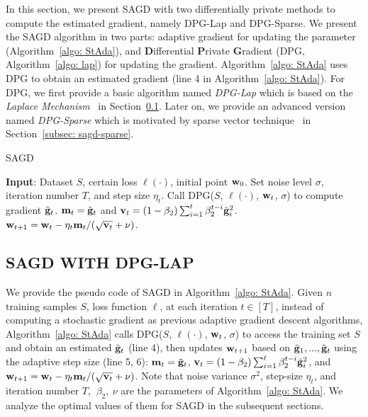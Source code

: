 \documentclass[11pt]{article}
\begin{document}
In this section, we present SAGD with two differentially private methods to compute the estimated gradient, namely DPG-Lap and DPG-Sparse.
We present the SAGD algorithm in two parts: adaptive gradient for updating the parameter (Algorithm~\ref{algo: StAda}), and \textbf{D}ifferential \textbf{P}rivate\textbf{ G}radient (DPG, Algorithm~\ref{algo: lap}) for updating the gradient. Algorithm~\ref{algo: StAda} uses 
DPG to obtain an estimated gradient (line 4 in Algorithm~\ref{algo: StAda}). For DPG, we first provide a basic algorithm named \emph{DPG-Lap} which is based on the \emph{Laplace Mechanism}~\citep{dwro2014} in Section~\ref{subsec: sagd_lap}. Later on, we provide an advanced version named \emph{DPG-Sparse} which is motivated by sparse vector technique~\citep{dwro2014} in Section~\ref{subsec: sagd-sparse}.

\begin{algorithm}[h!] 
\caption{SAGD}
\begin{algorithmic}[1] \label{algo: StAda}
\STATE \textbf{Input}: Dataset $S$,  certain loss $\ell(\cdot)$, initial point $\mathbf{w}_0$.
\STATE Set  noise level $\sigma$, iteration number $T$,  and step size $\eta_t$.
\STATE  Call DPG($S$,  $\ell(\cdot)$, $\mathbf{w}_t$, $\sigma$) to compute gradient $\tilde {\mathbf{g}}_t$.
\STATE 
$\mathbf{m}_t = \tilde {\mathbf{g}}_t$ and $\mathbf{v}_t = \left(1-\beta_{2}\right) \sum_{i=1}^{t} \beta_{2}^{t-i} \tilde {\mathbf{g}}_{i}^{2}$.
\STATE $\mathbf{w}_{t+1}=\mathbf{w}_{t}-\eta_t \mathbf{m}_t /(\sqrt{\mathbf{v}_t}+\nu)$.
\ENDFOR 
\end{algorithmic}
\end{algorithm}

\subsection{SAGD WITH DPG-LAP} \label{subsec: sagd_lap}
We provide the pseudo code of SAGD in Algorithm~\ref{algo: StAda}. Given $n$ training samples $S$, loss function $\ell$, at each iteration $t \in [T]$, instead of computing a stochastic gradient as previous adaptive gradient descent algorithms, 
Algorithm~\ref{algo: StAda} calls DPG($S$,  $\ell(\cdot)$, $\mathbf{w}_t$, $\sigma$) to access the training set $S$ and obtain an estimated $\tilde {\mathbf{g}}_t$ (line 4), then updates $\mathbf{w}_{t+1}$ based on $\tilde {\mathbf{g}}_1,..., \tilde {\mathbf{g}}_t$ using the adaptive step size (line 5, 6):
$\mathbf{m}_t = \tilde {\mathbf{g}}_t$, $\mathbf{v}_t = \left(1-\beta_{2}\right) \sum_{i=1}^{t} \beta_{2}^{t-i} \tilde {\mathbf{g}}_{i}^{2}$, and
 $\mathbf{w}_{t+1}=\mathbf{w}_{t}-\eta_t \mathbf{m}_t /(\sqrt{\mathbf{v}_t}+\nu)$.
Note that noise variance $\sigma^2$, step-size $\eta_t$, and iteration number $T$, $~ \beta_2,~\nu$ are the parameters of Algorithm~\ref{algo: StAda}. We analyze the optimal values of them for SAGD in the subsequent sections. 
\end{document}

